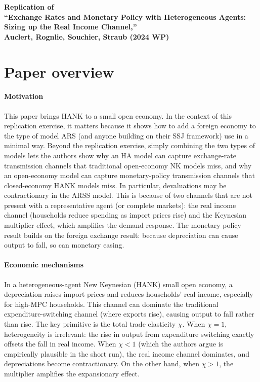 \documentclass[12pt]{article}
\begin{document}
\rhead{\today}
\begin{center}
\textbf{
{\large Replication of\\\enquote{Exchange Rates and Monetary Policy with Heterogeneous Agents: Sizing up the Real Income Channel,}\\Auclert, Rognlie, Souchier, Straub (2024 WP)}}
\end{center}

\tableofcontents
\newpage


\section{Paper overview}
\paragraph{Motivation}
This paper brings HANK to a small open economy. In the context of this replication exercise, it matters because it shows how to add a foreign economy to the type of model ARS (and anyone building on their SSJ framework) use in a minimal way. Beyond the replication exercise, simply combining the two types of models lets the authors show why an HA model can capture exchange-rate transmission channels that traditional open-economy NK models miss, and why an open-economy model can capture monetary-policy transmission channels that closed-economy HANK models miss. In particular, devaluations may be contractionary in the ARSS model. This is because of two channels that are not present with a representative agent (or complete markets): the real income channel (households reduce spending as import prices rise) and the Keynesian multiplier effect, which amplifies the demand response. The monetary policy result builds on the foreign exchange result: because depreciation can cause output to fall, so can monetary easing.

\paragraph{Economic mechanisms}
In a heterogeneous-agent New Keynesian (HANK) small open economy, a depreciation raises import prices and reduces households' real income, especially for high-MPC households. This channel can dominate the traditional expenditure-switching channel (where exports rise), causing output to fall rather than rise. The key primitive is the total trade elasticity $\chi$. When $\chi = 1$, heterogeneity is irrelevant: the rise in output from expenditure switching exactly offsets the fall in real income. When $\chi<1$ (which the authors argue is empirically plausible in the short run), the real income channel dominates, and depreciations become contractionary. On the other hand, when $\chi >1$, the multiplier amplifies the expansionary effect.
 
\end{document}
